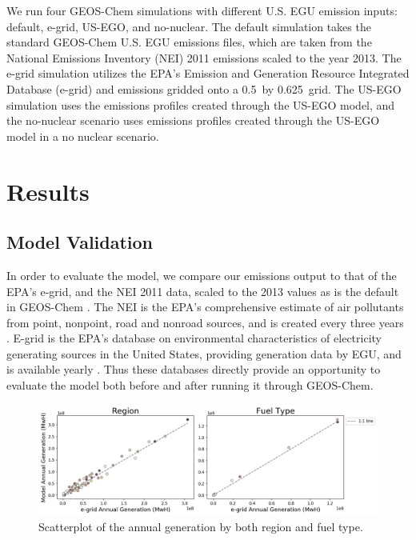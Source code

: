 \documentclass[12]{article}
\begin{document}
We run four GEOS-Chem simulations with different U.S. EGU emission inputs: default, e-grid, US-EGO, and no-nuclear. The default simulation takes the standard GEOS-Chem U.S. EGU emissions files, which are taken from the National Emissions Inventory (NEI) 2011 emissions scaled to the year 2013. The e-grid simulation utilizes the EPA's Emission and Generation Resource Integrated Database (e-grid) \citep{epa_emissions_2016}  and  emissions gridded onto a 0.5\textdegree~by 0.625\textdegree~grid. The US-EGO simulation uses the emissions profiles created through the US-EGO model, and the no-nuclear scenario uses emissions profiles created through the US-EGO model in a no nuclear scenario. 

\section{Results}
\subsection{Model Validation}

In order to evaluate the model, we compare our emissions output to that of the EPA's e-grid, and the NEI 2011 data, scaled to the 2013 values as is the default in GEOS-Chem \citep{geos-chem_epanei11_2019}. The NEI is the EPA's comprehensive estimate of air pollutants from point, nonpoint, road and nonroad sources, and is created every three years \citep{us_epa_national_2015}. E-grid is the EPA's database on environmental characteristics of electricity generating sources in the United States, providing generation data by EGU, and is available yearly \citep{us_epa_emissions_2015}. Thus these databases directly provide an opportunity to evaluate the model both before and after running it through GEOS-Chem.

\begin{figure}[h!]
    \centering
    \includegraphics[width=1.\textwidth]{ego_nonuclear_project/Figures/egrid_model.png}
    \caption{Scatterplot of the annual generation by both region and fuel type.} 
    \label{fig:emissions_region}
\end{figure}
\end{document}
